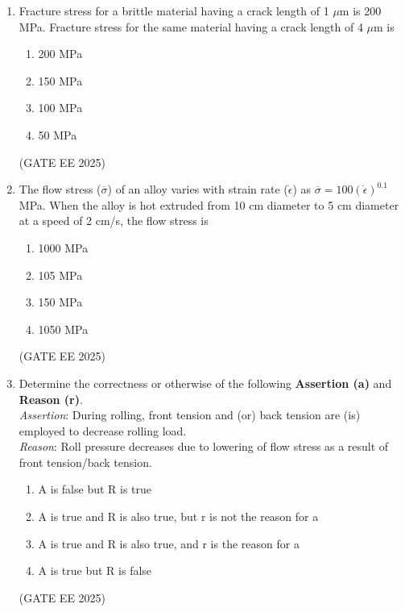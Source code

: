 \documentclass[11pt, letterpaper]{article}
\theoremstyle{remark}
\begin{document}
\begin{enumerate}
\begin{multicols}{2}
\begin{enumerate}  
\item P-2, Q-3, R-4, S-1
\item P-2, Q-4, R-3, S-1
\item P-1, Q-2, R-4, S-3
\item P-1, Q-2, R-4, S-3
\end{enumerate}
\end{multicols}
\hfill(GATE EE 2025)

\item Fracture stress for a brittle material having a crack length of 1 $\mu$m is 200 MPa. Fracture stress for the same material having a crack length of 4 $\mu$m is
\begin{multicols}{2}
\begin{enumerate}  
\item 200 MPa
\item 150 MPa
\item 100 MPa
\item 50 MPa
\end{enumerate}
\end{multicols}
\hfill(GATE EE 2025)

\item The flow stress ($\overline{\sigma}$) of an alloy varies with strain rate ($\dot{\epsilon}$) as $\overline{\sigma} = 100(\dot{\epsilon})^{0.1}$ MPa. When the alloy is hot extruded from 10 cm diameter to 5 cm diameter at a speed of 2 cm/s, the flow stress is
\begin{multicols}{2}
\begin{enumerate}  
\item 1000 MPa
\item 105 MPa
\item 150 MPa
\item 1050 MPa
\end{enumerate}
\end{multicols}
\hfill(GATE EE 2025)

\item Determine the correctness or otherwise of the following \textbf{Assertion (a)} and \textbf{Reason (r)}.
\\[0.5em]\textit{Assertion}: During rolling, front tension and (or) back tension are (is) employed to decrease rolling load.\\
\textit{Reason}: Roll pressure decreases due to lowering of flow stress as a result of front tension/back tension.
\begin{enumerate}  
\item A is false but R is true
\item A is true and R is also true, but r is not the reason for a
\item A is true and R is also true, and r is the reason for a
\item A is true but R is false
\end{enumerate}
\hfill(GATE EE 2025)



\end{enumerate}
\end{document}
